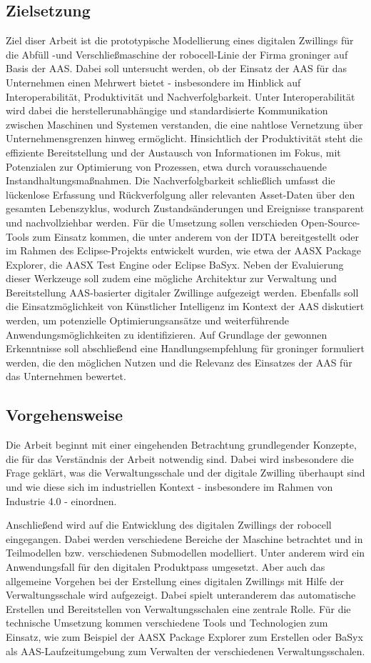\subsection{Zielsetzung}
Ziel diser Arbeit ist die prototypische Modellierung eines digitalen Zwillings für die Abfüll -und Verschließmaschine der robocell-Linie der Firma groninger auf Basis der AAS.
Dabei soll untersucht werden, ob der Einsatz der AAS für das Unternehmen einen Mehrwert bietet - insbesondere im Hinblick auf Interoperabilität, Produktivität und Nachverfolgbarkeit.
Unter Interoperabilität wird dabei die herstellerunabhängige und standardisierte Kommunikation zwischen Maschinen und Systemen verstanden, die eine nahtlose Vernetzung über Unternehmensgrenzen hinweg ermöglicht.
Hinsichtlich der Produktivität steht die effiziente Bereitstellung und der Austausch von Informationen im Fokus, mit Potenzialen zur Optimierung von Prozessen, etwa durch vorausschauende Instandhaltungsmaßnahmen. 
Die Nachverfolgbarkeit schließlich umfasst die lückenlose Erfassung und Rückverfolgung aller relevanten Asset-Daten über den gesamten Lebenszyklus, wodurch Zustandsänderungen und Ereignisse transparent und nachvollziehbar werden.
Für die Umsetzung sollen verschieden Open-Source-Tools zum Einsatz kommen, die unter anderem von der IDTA bereitgestellt oder im Rahmen des Eclipse-Projekts entwickelt wurden, wie etwa der AASX Package Explorer, die AASX Test Engine oder Eclipse BaSyx.
Neben der Evaluierung dieser Werkzeuge soll zudem eine mögliche Architektur zur Verwaltung und Bereitstellung AAS-basierter digitaler Zwillinge aufgezeigt werden.
Ebenfalls soll die Einsatzmöglichkeit von Künstlicher Intelligenz im Kontext der AAS diskutiert werden, um potenzielle Optimierungsansätze und weiterführende Anwendungsmöglichkeiten zu identifizieren.
Auf Grundlage der gewonnen Erkenntnisse soll abschließend eine Handlungsempfehlung für groninger formuliert werden, die den möglichen Nutzen und die Relevanz des Einsatzes der AAS für das Unternehmen bewertet.
\subsection{Vorgehensweise}
Die Arbeit beginnt mit einer eingehenden Betrachtung grundlegender Konzepte, die für das Verständnis der Arbeit notwendig sind. 
Dabei wird insbesondere die Frage geklärt, was die Verwaltungsschale und der digitale Zwilling überhaupt sind und wie diese sich im industriellen Kontext - insbesondere im Rahmen von Industrie 4.0 - einordnen.

Anschließend wird auf die Entwicklung des digitalen Zwillings der robocell eingegangen. 
Dabei werden verschiedene Bereiche der Maschine betrachtet und in Teilmodellen bzw. verschiedenen Submodellen modelliert.
Unter anderem wird ein Anwendungsfall für den digitalen Produktpass umgesetzt.
Aber auch das allgemeine Vorgehen bei der Erstellung eines digitalen Zwillings mit Hilfe der Verwaltungsschale wird aufgezeigt.
Dabei spielt unteranderem das automatische Erstellen und Bereitstellen von Verwaltungsschalen eine zentrale Rolle.
Für die technische Umsetzung kommen verschiedene Tools und Technologien zum Einsatz, wie zum Beispiel der AASX Package Explorer zum Erstellen oder BaSyx als AAS-Laufzeitumgebung zum Verwalten der verschiedenen Verwaltungsschalen.


